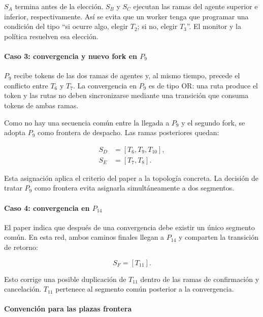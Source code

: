 \documentclass[11pt,a4paper]{article}
\begin{document}
$S_A$ termina antes de la elección. $S_B$ y $S_C$ ejecutan las ramas del
agente superior e inferior, respectivamente. Así se evita que un worker tenga
que programar una condición del tipo ``si ocurre algo, elegir $T_2$; si no,
elegir $T_3$''. El monitor y la política resuelven esa elección.

\paragraph{Caso 3: convergencia y nuevo fork en $P_9$}

$P_9$ recibe tokens de las dos ramas de agentes y, al mismo tiempo, precede el
conflicto entre $T_6$ y $T_7$. La convergencia en $P_9$ es de tipo OR: una ruta
produce el token y las rutas no deben sincronizarse mediante una transición que
consuma tokens de ambas ramas.

Como no hay una secuencia común entre la llegada a $P_9$ y el segundo fork, se
adopta $P_9$ como frontera de despacho. Las ramas posteriores quedan:

\begin{align*}
    S_D &= [T_6,T_9,T_{10}],\\
    S_E &= [T_7,T_8].
\end{align*}

Esta asignación aplica el criterio del paper a la topología concreta. La
decisión de tratar $P_9$ como frontera evita asignarla simultáneamente a dos
segmentos.

\paragraph{Caso 4: convergencia en $P_{14}$}

El paper indica que después de una convergencia debe existir un único segmento
común. En esta red, ambos caminos finales llegan a $P_{14}$ y comparten la
transición de retorno:

\begin{equation}
    S_F=[T_{11}].
\end{equation}

Esto corrige una posible duplicación de $T_{11}$ dentro de las ramas de
confirmación y cancelación. $T_{11}$ pertenece al segmento común posterior a la
convergencia.

\paragraph{Convención para las plazas frontera}
\end{document}
